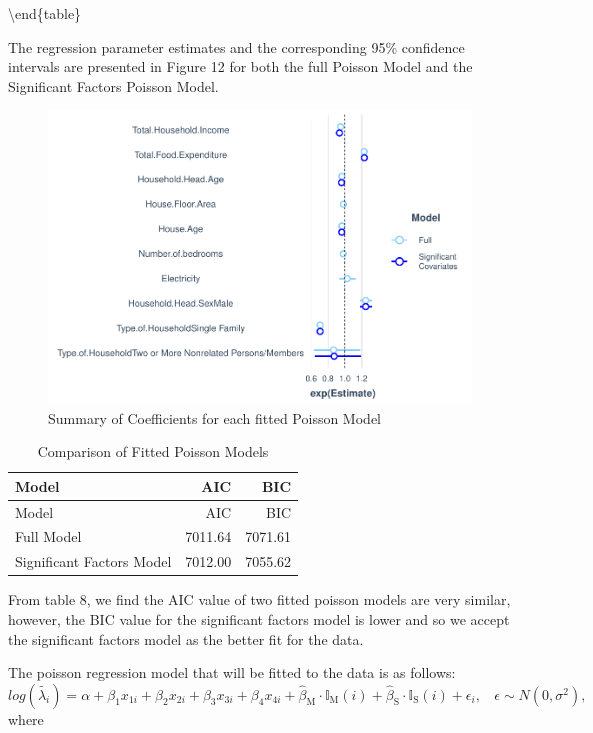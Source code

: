 \documentclass[
]{article}
\begin{document}
\textbackslash end\{table\}

The regression parameter estimates and the corresponding 95\% confidence
intervals are presented in Figure 12 for both the full Poisson Model and
the Significant Factors Poisson Model.

\begin{figure}[H]

{\centering \includegraphics[width=0.8\linewidth]{Group_01_files/figure-latex/summary plot-1} 

}

\caption{Summary of Coefficients for each fitted Poisson Model}\label{fig:summary plot}
\end{figure}

\begin{longtable}[]{@{}lrr@{}}
\caption{Comparison of Fitted Poisson Models}\tabularnewline
\toprule
Model & AIC & BIC \\
\midrule
\endfirsthead
\toprule
Model & AIC & BIC \\
\midrule
\endhead
Full Model & 7011.64 & 7071.61 \\
Significant Factors Model & 7012.00 & 7055.62 \\
\bottomrule
\end{longtable}

From table 8, we find the AIC value of two fitted poisson models are
very similar, however, the BIC value for the significant factors model
is lower and so we accept the significant factors model as the better
fit for the data.

The poisson regression model that will be fitted to the data is as
follows:
\[log(\tilde{\lambda_i}) = \alpha + \beta_1 x_{1i} + \beta_2 x_{2i} + \beta_3 x_{3i} + \beta_4 x_{4i} + \widehat{\beta}_{\mbox{M}} \cdot \mathbb{I}_{\mbox{M}}(i)+\widehat{\beta}_{\mbox{S}} \cdot \mathbb{I}_{\mbox{S}}(i) + \epsilon_i, ~~~~ \epsilon \sim N(0, \sigma^2),\]
where
\end{document}
